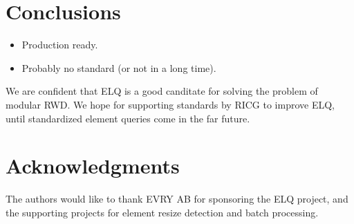 \documentclass{acm_proc_article-sp}
\newcommand{\elq}{ELQ}
\begin{document}
\section{Conclusions}
  \begin{itemize}
    \item Production ready.
    \item Probably no standard (or not in a long time).
  \end{itemize}

  We are confident that \elq{} is a good canditate for solving the problem of modular RWD.
  We hope for supporting standards by RICG to improve \elq{}, until standardized element queries come in the far future.


\section{Acknowledgments}
The authors would like to thank EVRY AB for sponsoring the \elq{} project, and the supporting projects for element resize detection and batch processing.

%

%
%
\end{document}
